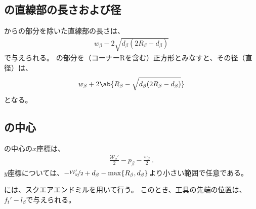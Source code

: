 \clearpage
\subsection{\EndFaceBoringWidth の直線部の長さおよび径}
\EndFaceBoringWidth から\EndFaceBoringCornerR の部分を除いた直線部の長さは、
\begin{align*}
  w_\beta-2\sqrt{d_\beta(2R_\beta-d_\beta)}
\end{align*}
で与えられる。
\EndFaceBoring の部分を（コーナーRを含む）正方形とみなすと、その径（直径）は、
\begin{align*}
  w_\beta+2\ab\{R_\beta-\sqrt{d_\beta(2R_\beta-d_\beta)}\}
\end{align*}
となる。


\subsection{\EndFaceBoring の中心}
\EndFaceBoringWidth の中心の$x$座標は、
\begin{align*}
  \frac{\mathcal W_x'}2-p_\beta-\frac{w_\beta}2\ .
\end{align*}
$y$座標については、$-\nicefrac{\mathcal W_y'}2+d_\beta-\max\{R_\beta, d_\beta\}$より小さい範囲で任意である。



\EndFaceBoringMilling には、スクエアエンドミルを用いて行う。
このとき、工具の先端の位置は、$f_t'-l_\beta$で与えられる。
